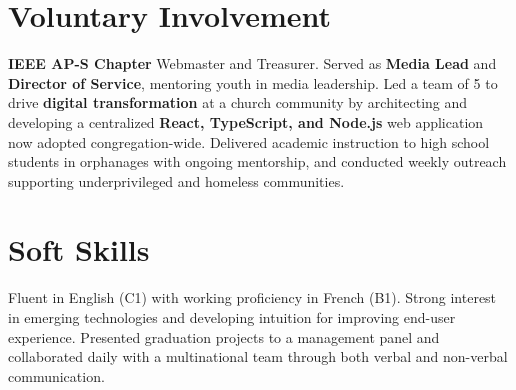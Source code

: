 \documentclass[letterpaper,11pt]{article}
\begin{document}
\section{Voluntary Involvement}
\textbf{IEEE AP-S Chapter} Webmaster and Treasurer. Served as \textbf{Media Lead} and \textbf{Director of Service}, mentoring youth in media leadership. Led a team of 5 to drive \textbf{digital transformation} at a church community by architecting and developing a centralized \textbf{React, TypeScript, and Node.js} web application now adopted congregation-wide. Delivered academic instruction to high school students in orphanages with ongoing mentorship, and conducted weekly outreach supporting underprivileged and homeless communities.






\section{Soft Skills}
Fluent in English (C1) with working proficiency in French (B1). Strong interest in emerging technologies and developing intuition for improving end-user experience. Presented graduation projects to a management panel and collaborated daily with a multinational team through both verbal and non-verbal communication.
\end{document}
